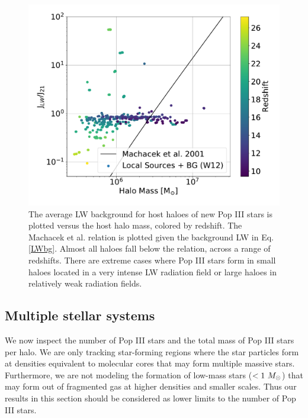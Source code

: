 \documentclass[fleqn,usenatbib]{mnras}
\begin{document}
\begin{figure}
	\includegraphics[width=\columnwidth]{images/jlw_mass_machacek_total.pdf}
	\caption{The average LW background for host haloes of new Pop III stars is plotted versus the host halo mass, colored by redshift. The Machacek et al. relation is plotted given the background LW in Eq. \ref{LWbg}. Almost all haloes fall below the relation, across a range of redshifts. There are extreme cases where Pop III stars form in small haloes located in a very intense LW radiation field or large haloes in relatively weak radiation fields.}
    \label{fig:jlw_mass_machacek}
\end{figure}

\subsection{Multiple stellar systems}

We now inspect the number of Pop III stars and the total mass of Pop III stars per halo. We are only tracking star-forming regions where the star particles form at densities equivalent to molecular cores that may form multiple massive stars.  Furthermore, we are not modeling the formation of low-mass stars ($<1~\Ms$) that may form out of fragmented gas at higher densities and smaller scales.  Thus our results in this section should be considered as lower limits to the number of Pop III stars.
\end{document}

